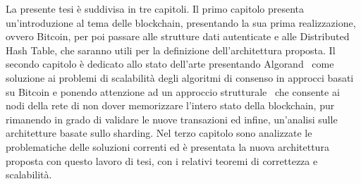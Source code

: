 La presente tesi è suddivisa in tre capitoli. Il primo capitolo presenta un'introduzione al tema delle blockchain, presentando la sua prima realizzazione, ovvero Bitcoin, per poi passare alle strutture dati autenticate e alle Distributed Hash Table, che saranno utili per la definizione dell'architettura proposta. Il secondo capitolo è dedicato allo stato dell'arte presentando Algorand~\cite{gilad2017algorand} come soluzione ai problemi di scalabilità degli algoritmi di consenso in approcci basati su Bitcoin e ponendo attenzione ad un approccio strutturale~\cite{bernardini2019blockchains} che consente ai nodi della rete di non dover memorizzare l'intero stato della blockchain, pur rimanendo in grado di validare le nuove transazioni ed infine, un'analisi sulle architetture basate sullo sharding. Nel terzo capitolo sono analizzate le problematiche delle soluzioni correnti ed è presentata la nuova architettura proposta con questo lavoro di tesi, con i relativi teoremi di correttezza e scalabilità.